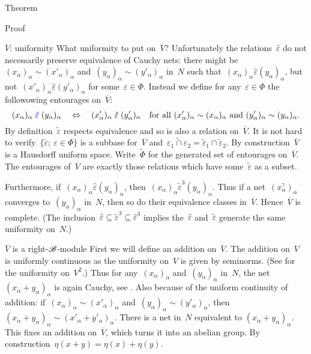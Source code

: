 \documentclass[b]{subfiles}
\begin{document}
\begin{parsec}
\begin{point}{Theorem}
\begin{point}{Proof}
\begin{point}{$\overline{V}$: uniformity}
What uniformity to put on~$\overline{V}$?
Unfortunately the relations~$\hat\varepsilon$ do not necessarily preserve
    equivalence of Cauchy nets:
    there might be~$(x_\alpha)_\alpha \sim (x'_\alpha)_\alpha$
    and~$(y_\alpha)_\alpha \sim (y'_\alpha)_\alpha$ in~$N$
such that~$(x_\alpha)_\alpha \mathrel{\hat\varepsilon} (y_\alpha)_\alpha$,
but not~$(x'_\alpha)_\alpha \mathrel{\hat\varepsilon} (y'_\alpha)_\alpha$
for some~$\varepsilon \in \Phi$.
Instead we define for any~$\varepsilon \in \Phi$
the followowing entourages on~$\overline{V}$:
\begin{equation*}
    (x_\alpha)_\alpha \mathrel{\Define{\tilde\varepsilon}}
    (y_\alpha)_\alpha \quad\Leftrightarrow\quad
    (x'_\alpha)_\alpha \mathrel{\hat\varepsilon}
    (y'_\alpha)_\alpha \quad
    \text{for all
        $(x'_\alpha)_\alpha \sim (x_\alpha)_\alpha$ 
    and $(y'_\alpha)_\alpha \sim (y_\alpha)_\alpha$.}
\end{equation*}
By definition~$\tilde\varepsilon$
respects equivalence and so is also a relation on~$\overline{V}$.
It is not hard to verify~$\{ \tilde\varepsilon ;\ \varepsilon \in \Phi\}$
is a subbase for~$\overline{V}$
and~$\widetilde{\varepsilon_1 \cap \varepsilon_2} = \tilde{\varepsilon}_1
\cap \tilde{\varepsilon}_2$.
By construction~$\overline{V}$ is a Hausdorff uniform space.
Write~$\tilde\Phi$ for the generated set of entourages on~$\overline{V}$.
The entourages of~$\overline{V}$ are exactly those relations
    which have some~$\tilde\varepsilon$
    as a subset.

Furthermore, if~$(x_\alpha)_\alpha \mathrel{\hat\varepsilon}
(y_\alpha)_\alpha $,
then~$(x_\alpha)_\alpha \mathrel{\tilde\varepsilon^3} (y_\alpha)_\alpha$.
Thus if a net~$(x^\gamma_\alpha)_\alpha$
converges to~$(y_\alpha)_\alpha$ in~$N$,
then so do their equivalence classes in~$\overline{V}$.
Hence~$\overline{V}$ is complete.
(The inclusion~$\hat\varepsilon \subseteq \tilde\varepsilon^3 \subseteq
        \hat\varepsilon^3$
        implies the~$\hat\varepsilon$ and~$\tilde\varepsilon$
        generate the same uniformity on~$N$.)
\end{point}
\begin{point}{$\overline{V}$ is a right-$\mathscr{B}$-module}%
    First we will define an addition on~$\overline{V}$.
    The addition on~$V$ is uniformly continuous
        as the uniformity on~$V$ is given by seminorms.
    (See  for the uniformity on~$V^2$.)
    Thus for any~$(x_\alpha)_\alpha$
    and~$(y_\alpha)_\alpha$ in~$N$,
    the net~$(x_\alpha+y_\alpha)_\alpha$ is again Cauchy,
        see .
    Also because of the uniform continuity of addition:
    if~$(x_\alpha)_\alpha \sim (x'_\alpha)_\alpha$
    and~$(y_\alpha)_\alpha \sim (y'_\alpha)_\alpha$,
    then~$(x_\alpha+y_\alpha)_\alpha \sim
            (x'_\alpha+y'_\alpha)_\alpha$.
    There is a net in~$N$ equivalent to $(x_\alpha+y_\alpha)_\alpha$.
    This fixes an addition on~$\overline{V}$,
        which turns it into an abelian group.
        By construction~$\eta(x+y) = \eta(x)+\eta(y)$.


\end{point}
\end{point}
\end{point}
\end{parsec}
\end{document}
